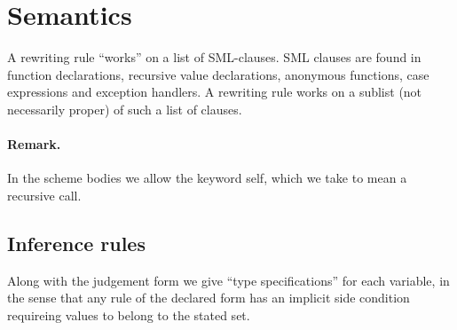 
\section{Semantics}
A rewriting rule ``works'' on a list of SML-clauses. SML clauses are found in
function declarations, recursive value declarations, anonymous functions, case
expressions and exception handlers. A rewriting rule works on a sublist (not
necessarily proper) of such a list of clauses.

\paragraph{Remark.} In the scheme bodies we allow the keyword \textsf{self},
which we take to mean a recursive call.

\subsection{Inference rules}
\def\TheTrueColour{Maroon}
\newcommand{\becomesthrough}[3]{\ensuremath{#1}\textsf{\color{\TheTrueColour}\ becomes\ }\ensuremath{#2}\textsf{\color{\TheTrueColour}\ through\ }\ensuremath{#3}}

Along with the judgement form we give ``type specifications'' for each variable,
in the sense that any rule of the declared form has an implicit side condition
requireing values to belong to the stated set.







